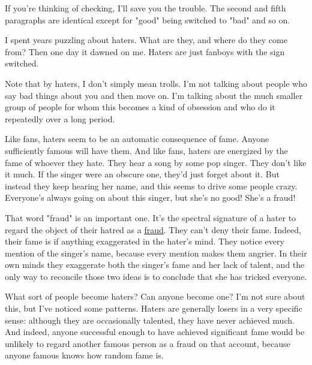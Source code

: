 If
                  you're thinking of checking, I'll save you the trouble. The
                  second and fifth paragraphs are identical except for "good"
                  being switched to "bad" and so on.

I spent years
                  puzzling about haters. What are they, and where do they come
                  from? Then one day it dawned on me. Haters are just fanboys
                  with the sign switched.

Note that by haters, I
                  don't simply mean trolls. I'm not talking about people who say
                  bad things about you and then move on. I'm talking about the
                  much smaller group of people for whom this becomes a kind of
                  obsession and who do it repeatedly over a long period.

Like
                  fans, haters seem to be an automatic consequence of fame.
                  Anyone sufficiently famous will have them. And like fans,
                  haters are energized by the fame of whoever they hate. They
                  hear a song by some pop singer. They don't like it much. If
                  the singer were an obscure one, they'd just forget about it.
                  But instead they keep hearing her name, and this seems to
                  drive some people crazy. Everyone's always going on about this
                  singer, but she's no good! She's a fraud!

That word
                  "fraud" is an important one. It's the spectral signature of a
                  hater to regard the object of their hatred as a
                  \href{https://twitter.com/search?q=Musk\%20fraud\&src=typed\_query\&f=live}{\underline{fraud}}. They can't deny their fame. Indeed, their fame is if
                  anything exaggerated in the hater's mind. They notice every
                  mention of the singer's name, because every mention makes them
                  angrier. In their own minds they exaggerate both the singer's
                  fame and her lack of talent, and the only way to reconcile
                  those two ideas is to conclude that she has tricked
                  everyone.

What sort of people become haters? Can
                  anyone become one? I'm not sure about this, but I've noticed
                  some patterns. Haters are generally losers in a very specific
                  sense: although they are occasionally talented, they have
                  never achieved much. And indeed, anyone successful enough to
                  have achieved significant fame would be unlikely to regard
                  another famous person as a fraud on that account, because
                  anyone famous knows how random fame is.

